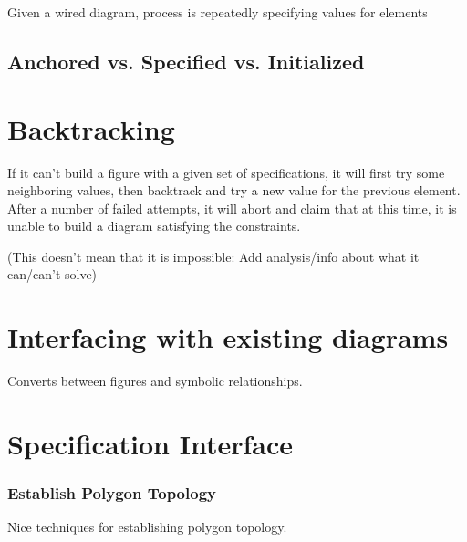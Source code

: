 Given a wired diagram, process is repeatedly specifying values for elements

\subsection{Anchored vs. Specified vs. Initialized}

\section{Backtracking}

If it can't build a figure with a given set of specifications, it will
first try some neighboring values, then backtrack and try a new value
for the previous element. After a number of failed attempts, it will
abort and claim that at this time, it is unable to build a diagram
satisfying the constraints.

(This doesn't mean that it is impossible: Add analysis/info about what
it can/can't solve)

\section{Interfacing with existing diagrams}

Converts between figures and symbolic relationships.

\section{Specification Interface}

\subsubsection{Establish Polygon Topology}

Nice techniques for establishing polygon topology.
